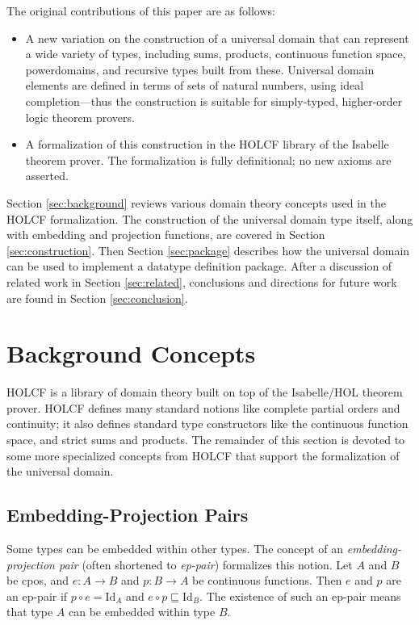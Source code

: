 \documentclass{llncs}
\begin{document}
The original contributions of this paper are as follows:
\begin{itemize}

\item A new variation on the construction of a universal domain that
  can represent a wide variety of types, including sums, products,
  continuous function space, powerdomains, and recursive types built
  from these.  Universal domain elements are defined in terms of sets
  of natural numbers, using ideal completion---thus the construction
  is suitable for simply-typed, higher-order logic theorem provers.

\item A formalization of this construction in the HOLCF library of the
  Isabelle theorem prover.  The formalization is fully definitional;
  no new axioms are asserted.

\end{itemize}

Section \ref{sec:background} reviews various domain theory concepts
used in the HOLCF formalization.  The construction of the universal
domain type itself, along with embedding and projection functions, are
covered in Section \ref{sec:construction}.  Then Section
\ref{sec:package} describes how the universal domain can be used to
implement a datatype definition package.  After a discussion of
related work in Section \ref{sec:related}, conclusions and directions
for future work are found in Section \ref{sec:conclusion}.

\section{\label{sec:background}Background Concepts}

HOLCF \cite{MuellerNvOS99} is a library of domain theory built on top
of the Isabelle/HOL theorem prover.  HOLCF defines many standard
notions like complete partial orders and continuity; it also defines
standard type constructors like the continuous function space, and
strict sums and products. The remainder of this section is devoted to
some more specialized concepts from HOLCF that support the
formalization of the universal domain.

\subsection{Embedding-Projection Pairs}

Some types can be embedded within other types.  The concept of an
\emph{embedding-projection pair} (often shortened to \emph{ep-pair})
formalizes this notion.  Let $A$ and $B$ be cpos, and $e : A
\rightarrow B$ and $p : B \rightarrow A$ be continuous functions.
Then $e$ and $p$ are an ep-pair if $p \circ e = \mathrm{Id}_A$ and $e
\circ p \sqsubseteq \mathrm{Id}_B$.  The existence of such an ep-pair
means that type $A$ can be embedded within type $B$.
\end{document}

